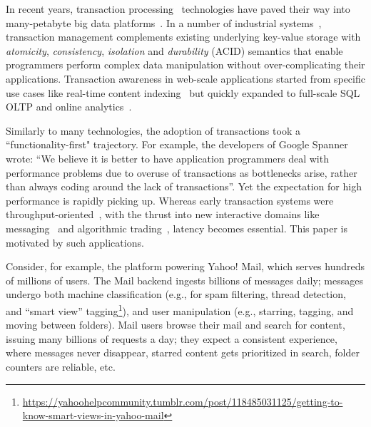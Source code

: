 In recent years, transaction processing~\cite{Gray:1992:TPC:573304} technologies have paved their way into many-petabyte big data 
platforms~\cite{Percolator2010,Spanner2012,Omid2017}. 
In a number of industrial systems~\cite{Percolator2010,Omid2017,tephra,cockroach}, transaction management complements 
existing underlying key-value storage with {\em atomicity}, {\em consistency}, {\em isolation\/} and 
{\em durability} (ACID) semantics that enable programmers perform 
complex data manipulation without over-complicating their applications. Transaction awareness 
in web-scale applications started from specific use cases like real-time content indexing~\cite{Percolator2010,
Omid2017} but quickly expanded to 
full-scale SQL OLTP and online analytics~\cite{Phoenix, F1-2013}.

Similarly to many technologies, the adoption of transactions took a  ``functionality-first" trajectory. 
For example, the developers of Google Spanner~\cite{Spanner2012} wrote: ``We believe it
is better to have application programmers deal with performance problems due to overuse 
of transactions as bottlenecks arise, rather than always coding around the lack of transactions''. 
Yet the expectation for high performance is rapidly picking up. %
Whereas early 
transaction systems were throughput-oriented~\cite{Percolator2010, Omid2017}, 
with the thrust into new interactive domains like messaging~\cite{Borthakur:2011} and algorithmic 
trading~\cite{opentsdb}, latency becomes essential. This paper is motivated by such  applications.

Consider, for example, the platform powering Yahoo! Mail, which serves hundreds of millions of users. 
The Mail backend ingests billions of messages daily; messages undergo both machine 
classification (e.g., for spam filtering, thread detection, and ``smart view'' tagging\footnote{\footnotesize{\url{
https://yahoohelpcommunity.tumblr.com/post/118485031125/getting-to-know-smart-views-in-yahoo-mail}}}),
and user manipulation (e.g., starring, tagging, and moving between folders).    
Mail users browse their mail and search for content, issuing many billions of requests a day; they
expect a consistent experience, where messages never 
disappear, starred content gets prioritized in search, folder counters are reliable, etc.

